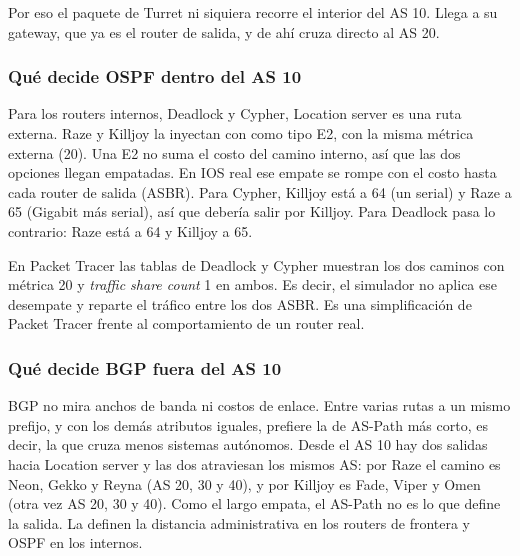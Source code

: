 
Por eso el paquete de Turret ni siquiera recorre el interior del AS 10. Llega a su gateway, que ya es el router de salida, y de ahí cruza directo al AS 20.

\subsubsection*{Qué decide OSPF dentro del AS 10}

Para los routers internos, Deadlock y Cypher, Location server es una ruta externa. Raze y Killjoy la inyectan con  como tipo E2, con la misma métrica externa (20). Una E2 no suma el costo del camino interno, así que las dos opciones llegan empatadas. En IOS real ese empate se rompe con el costo hasta cada router de salida (ASBR). Para Cypher, Killjoy está a 64 (un serial) y Raze a 65 (Gigabit más serial), así que debería salir por Killjoy. Para Deadlock pasa lo contrario: Raze está a 64 y Killjoy a 65.

En Packet Tracer las tablas de Deadlock y Cypher muestran los dos caminos con métrica 20 y \textit{traffic share count} 1 en ambos. Es decir, el simulador no aplica ese desempate y reparte el tráfico entre los dos ASBR. Es una simplificación de Packet Tracer frente al comportamiento de un router real.


\subsubsection*{Qué decide BGP fuera del AS 10}

BGP no mira anchos de banda ni costos de enlace. Entre varias rutas a un mismo prefijo, y con los demás atributos iguales, prefiere la de AS-Path más corto, es decir, la que cruza menos sistemas autónomos. Desde el AS 10 hay dos salidas hacia Location server y las dos atraviesan los mismos AS: por Raze el camino es Neon, Gekko y Reyna (AS 20, 30 y 40), y por Killjoy es Fade, Viper y Omen (otra vez AS 20, 30 y 40). Como el largo empata, el AS-Path no es lo que define la salida. La definen la distancia administrativa en los routers de frontera y OSPF en los internos.

